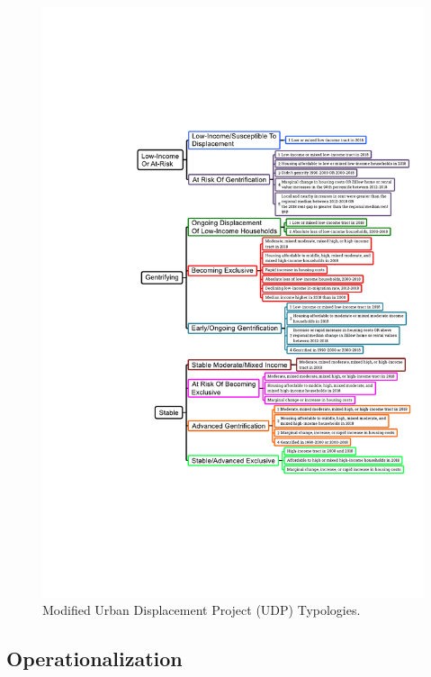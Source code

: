 \documentclass[12pt]{article}
\begin{document}
\begin{figure}[H]
  \centering %
  \includegraphics[width=\linewidth]{images/modified_typologies}
  \captionsetup{justification=centering, singlelinecheck=false, margin=2cm}
  \caption[Modified UDP Displacement Typologies]{Modified Urban Displacement Project (UDP) Typologies.}
  \label{fig:modified_typologies}
\end{figure}

\subsection{Operationalization}\
\end{document}
